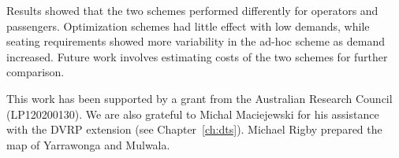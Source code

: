 Results showed that the two schemes performed differently for operators and
passengers. Optimization schemes had little effect with low demands, while
seating requirements showed more variability in the ad-hoc scheme as demand
increased. Future work involves estimating costs of the two schemes for further
comparison.

This work has been supported by a grant from the Australian Research Council (LP120200130). We are also grateful to Michal Maciejewski for his assistance with the DVRP extension (see Chapter~\ref{ch:dts}). Michael Rigby prepared the map of Yarrawonga and Mulwala.
